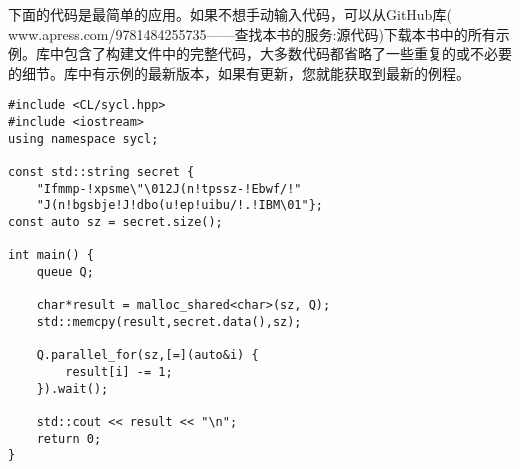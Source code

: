 下面的代码是最简单的应用。如果不想手动输入代码，可以从GitHub库(\\www.apress.com/9781484255735——查找本书的服务:源代码)下载本书中的所有示例。库中包含了构建文件中的完整代码，大多数代码都省略了一些重复的或不必要的细节。库中有示例的最新版本，如果有更新，您就能获取到最新的例程。\par

\begin{lstlisting}[caption={}]
#include <CL/sycl.hpp>
#include <iostream>
using namespace sycl;

const std::string secret {
	"Ifmmp-!xpsme\"\012J(n!tpssz-!Ebwf/!"
	"J(n!bgsbje!J!dbo(u!ep!uibu/!.!IBM\01"};
const auto sz = secret.size();

int main() {
	queue Q;
	
	char*result = malloc_shared<char>(sz, Q);
	std::memcpy(result,secret.data(),sz);
	
	Q.parallel_for(sz,[=](auto&i) {
		result[i] -= 1;
	}).wait();

	std::cout << result << "\n";
	return 0;
}
\end{lstlisting}